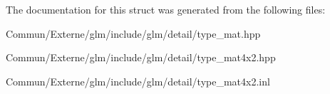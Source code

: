 The documentation for this struct was generated from the following files\+:\begin{DoxyCompactItemize}
\item 
Commun/\+Externe/glm/include/glm/detail/type\+\_\+mat.\+hpp\item 
Commun/\+Externe/glm/include/glm/detail/type\+\_\+mat4x2.\+hpp\item 
Commun/\+Externe/glm/include/glm/detail/type\+\_\+mat4x2.\+inl\end{DoxyCompactItemize}
